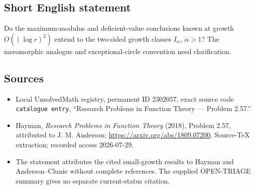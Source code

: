 \documentclass[11pt]{article}
\begin{document}
\subsection{Short English statement}
Do the maximum-modulus and deficient-value conclusions known at growth \(O((\log r)^2)\) extend to the two-sided growth classes \(I_\alpha\), \(\alpha>1\)? The meromorphic analogue and exceptional-circle convention need clarification.
\subsection{Sources}
\begin{itemize}
\item Local UnsolvedMath registry, permanent ID \(2302057\), exact source code \texttt{catalogue entry}, ``Research Problems in Function Theory --- Problem 2.57.''
\item Hayman, \emph{Research Problems in Function Theory} (2018), Problem 2.57, attributed to J. M. Anderson; \url{https://arxiv.org/abs/1809.07200}. Source-TeX extraction; recorded access 2026-07-29.
\item The statement attributes the cited small-growth results to Hayman and Anderson--Clunie without complete references. The supplied OPEN-TRIAGE summary gives no separate current-status citation.
\end{itemize}
\end{document}
